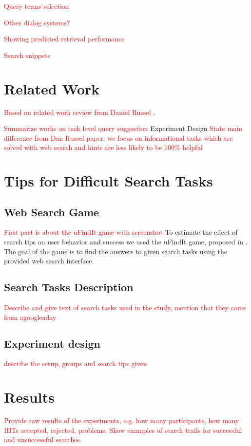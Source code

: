 \documentclass{sig-alternate}
\newcommand\todo[1]{\textcolor{red}{#1}}
\begin{document}
\todo{Query terms selection}

\todo{Other dialog systems?}

\todo{Showing predicted retrieval performance}

\todo{Search snippets}


\section{Related Work}
\todo{Based on related work review from Daniel Russel \cite{Moraveji:2011:MIU:2009916.2009966}}.

\todo{Summarize works on task level query suggestion}
Experiment Design
\todo{State main difference from Dan Russel paper: we focus on informational tasks which are solved with web search and hints are less likely to be 100\% helpful}

\section{Tips for Difficult Search Tasks}

\subsection{Web Search Game}
\todo{First part is about the uFindIt game with screenshot}
To estimate the effect of search tips on user behavior and success we used the uFindIt game, proposed in \cite{Ageev:2011:FYG:2009916.2009965}. The goal of the game is to find the answers to given search tasks using the provided web search interface. 

\subsection{Search Tasks Description}
\todo{Describe and give text of search tasks used in the study, mention that they came from agoogleaday}

\subsection{Experiment design}
\todo{describe the setup, groups and search tips given}

\section{Results}
\todo{Provide raw results of the experiments, e.g. how many participants, how many HITs accepted, rejected, problems. Show examples of search trails for successful and unsuccessful searches}.
\end{document}
